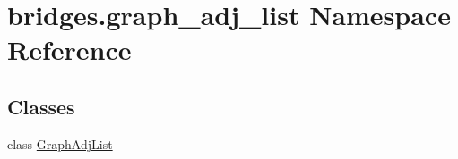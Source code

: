 \hypertarget{namespacebridges_1_1graph__adj__list}{}\section{bridges.\+graph\+\_\+adj\+\_\+list Namespace Reference}
\label{namespacebridges_1_1graph__adj__list}
\subsection*{Classes}
\begin{DoxyCompactItemize}
\item 
class \mbox{\hyperlink{classbridges_1_1graph__adj__list_1_1_graph_adj_list}{Graph\+Adj\+List}}
\end{DoxyCompactItemize}
